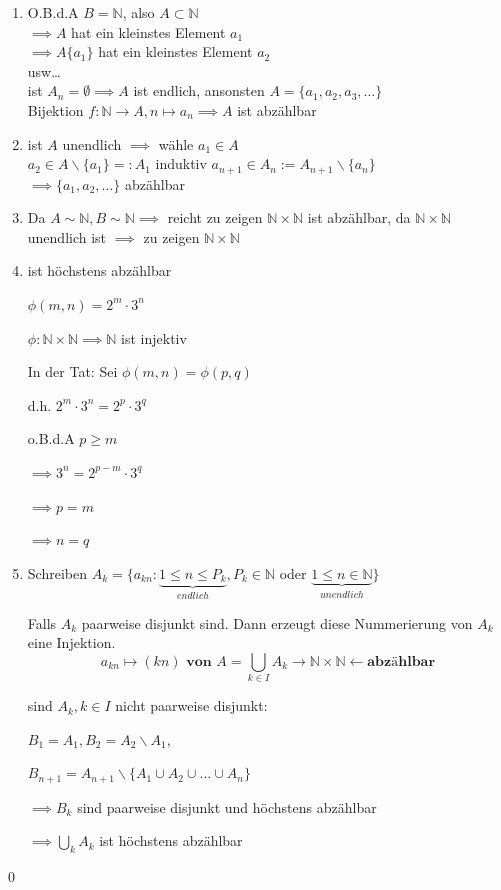 \documentclass[fleqn]{scrbook}
\newcommand{\N}{\mathbb{N}}
\renewenvironment{proof}{{\bfseries Beweis }}{\qed}
\begin{document}
\begin{proof}
\begin{enumerate}[1)]
\item O.B.d.A $B = \N$, also $A \subset \N$\\$\implies A$ hat ein kleinstes Element $a_1$\\$\implies A \{a_1\}$ hat ein kleinstes Element $a_2$\\usw\ldots\\ist $A_n = \emptyset \implies A$ ist endlich, ansonsten $A = \{a_1, a_2, a_3, \ldots\}$\\Bijektion $f:\N\rightarrow A, n\mapsto a_n \implies A$ ist abzählbar
\item ist $A$ unendlich $\implies$ wähle $a_1 \in A$\\
	$a_2 \in A \backslash \{a_1\} =: A_1$
	induktiv $a_{n+1} \in A_n := A_{n+1} \backslash \{a_n\}$\\
	$\implies \{a_1, a_2, \ldots\}$ abzählbar
	
\item Da $A \sim \N, B \sim \N \implies$ reicht zu zeigen $\N \times \N$ ist abzählbar, da $\N \times \N$ unendlich ist $\implies$ zu zeigen $\N \times \N$
\item ist höchstens abzählbar

	$\phi (m,n) = 2^m  \cdot  3^n$
	
	$\phi : \N \times \N \implies \N$ ist injektiv
	
	In der Tat: Sei $\phi (m,n) = \phi (p,q)$
	
	d.h. $2^m  \cdot  3^n = 2^p  \cdot  3^q$
	
	o.B.d.A $p \geq m$
	
	$\implies 3^n = 2^{p-m}  \cdot  3^q$
	
	$\implies p = m$
	
	$\implies n = q$
	
\item Schreiben $A_k = \{a_{kn} :\underbrace{1\leq n \leq P_k}_{endlich}, P_k \in \N$ oder $\underbrace{1 \leq n \in \N}_{unendlich}\}$

	Falls $A_k$ paarweise disjunkt sind. Dann erzeugt diese Nummerierung von $A_k$ eine Injektion.
	\[a_{kn} \mapsto (kn) \textbf{ von } A = \bigcup_{k \in I} A_k \rightarrow \N \times \N \leftarrow \textbf{abzählbar}\]
	
	sind $A_k, k \in I$ nicht paarweise disjunkt:
	
	$B_1 = A_1, B_2 = A_2 \backslash A_1,$
	
	$B_{n+1} = A_{n+1} \backslash \{A_1 \cup A_2 \cup \ldots \cup A_n\}$
	
	$\implies B_k$ sind paarweise disjunkt und höchstens abzählbar
	
	$\implies \bigcup_{k} A_k$ ist höchstens abzählbar
\end{enumerate}
\end{proof}
\end{document}
